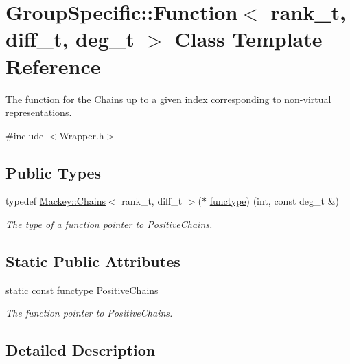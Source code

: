 \hypertarget{classGroupSpecific_1_1Function}{}\section{Group\+Specific\+:\+:Function$<$ rank\+\_\+t, diff\+\_\+t, deg\+\_\+t $>$ Class Template Reference}
\label{classGroupSpecific_1_1Function}


The function for the Chains up to a given index corresponding to non-\/virtual representations.  




{\ttfamily \#include $<$Wrapper.\+h$>$}

\subsection*{Public Types}
\begin{DoxyCompactItemize}
\item 
typedef \hyperlink{classMackey_1_1Chains}{Mackey\+::\+Chains}$<$ rank\+\_\+t, diff\+\_\+t $>$($\ast$ \hyperlink{classGroupSpecific_1_1Function_a73d984ea6bf824b9112d0cf978a46741}{functype}) (int, const deg\+\_\+t \&)
\begin{DoxyCompactList}\small\item\em The type of a function pointer to Positive\+Chains. \end{DoxyCompactList}\end{DoxyCompactItemize}
\subsection*{Static Public Attributes}
\begin{DoxyCompactItemize}
\item 
static const \hyperlink{classGroupSpecific_1_1Function_a73d984ea6bf824b9112d0cf978a46741}{functype} \hyperlink{classGroupSpecific_1_1Function_a6d247b31d297f733e9cd6f68921a37cd}{Positive\+Chains}
\begin{DoxyCompactList}\small\item\em The function pointer to Positive\+Chains. \end{DoxyCompactList}\end{DoxyCompactItemize}


\subsection{Detailed Description}
